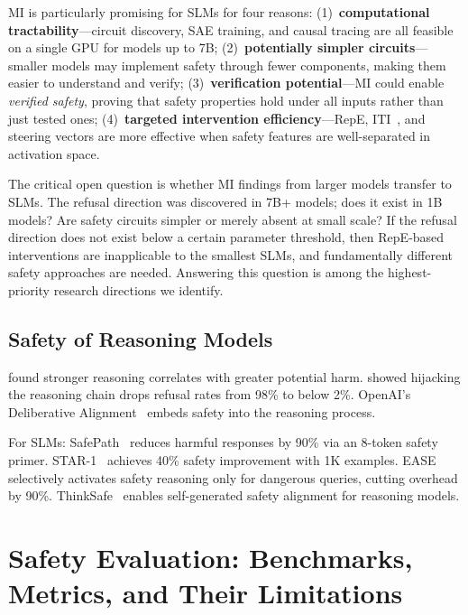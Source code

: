 \documentclass[12pt,a4paper]{article}
\begin{document}
MI is particularly promising for SLMs for four reasons: (1)~\textbf{computational tractability}---circuit discovery, SAE training, and causal tracing are all feasible on a single GPU for models up to 7B; (2)~\textbf{potentially simpler circuits}---smaller models may implement safety through fewer components, making them easier to understand and verify; (3)~\textbf{verification potential}---MI could enable \emph{verified safety}, proving that safety properties hold under all inputs rather than just tested ones; (4)~\textbf{targeted intervention efficiency}---RepE, ITI~\citep{li2023iti}, and steering vectors are more effective when safety features are well-separated in activation space.

The critical open question is whether MI findings from larger models transfer to SLMs. The refusal direction was discovered in 7B+ models; does it exist in 1B models? Are safety circuits simpler or merely absent at small scale? If the refusal direction does not exist below a certain parameter threshold, then RepE-based interventions are inapplicable to the smallest SLMs, and fundamentally different safety approaches are needed. Answering this question is among the highest-priority research directions we identify.

\subsection{Safety of Reasoning Models}

\citet{zhou2025hiddenrisks} found stronger reasoning correlates with greater potential harm. \citet{kuo2025hcot} showed hijacking the reasoning chain drops refusal rates from 98\% to below 2\%. OpenAI's Deliberative Alignment~\citep{openai2025deliberative} embeds safety into the reasoning process.

For SLMs: SafePath~\citep{safepath2025} reduces harmful responses by 90\% via an 8-token safety primer. STAR-1~\citep{star1_2025} achieves 40\% safety improvement with 1K examples. EASE~\citep{ease2025} selectively activates safety reasoning only for dangerous queries, cutting overhead by 90\%. ThinkSafe~\citep{thinksafe2026} enables self-generated safety alignment for reasoning models.

\section{Safety Evaluation: Benchmarks, Metrics, and Their Limitations}\label{sec:eval}
\end{document}
